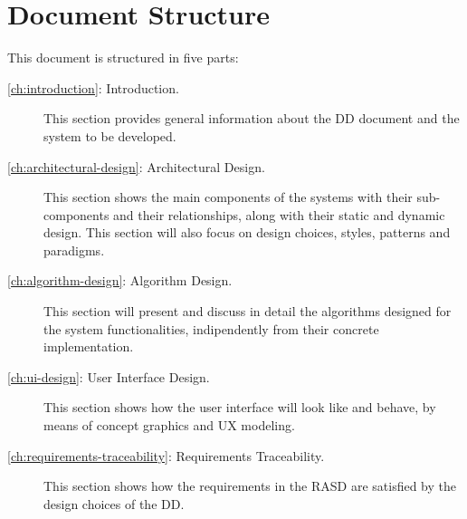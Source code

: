 \section{Document Structure}
\label{sec:structure}

This document is structured in five parts:
\begin{description}
\item[\autoref{ch:introduction}: Introduction.] This section provides general information about the DD document and the system to be developed.
\item[\autoref{ch:architectural-design}: Architectural Design.] This section shows the main components of the systems with their sub-components and their relationships, along with their static and dynamic design. This section will also focus on design choices, styles, patterns and paradigms.
\item[\autoref{ch:algorithm-design}: Algorithm Design.] This section will present and discuss in detail the algorithms designed for the system functionalities, indipendently from their concrete implementation.
\item[\autoref{ch:ui-design}: User Interface Design.] This section shows how the user interface will look like and behave, by means of concept graphics and UX modeling.
\item[\autoref{ch:requirements-traceability}: Requirements Traceability.] This section shows how the requirements in the RASD are satisfied by the design choices of the DD.
\end{description}
